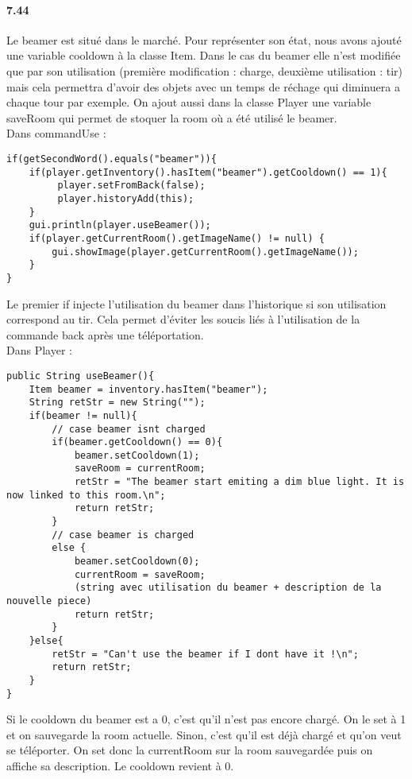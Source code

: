\documentclass[11pt,a4paper]{report}
\begin{document}
\paragraph{7.44}
Le beamer est situé dans le marché. Pour représenter son état, nous avons ajouté une variable cooldown à la classe Item. Dans le cas du beamer elle n'est modifiée que par son utilisation (première modification : charge, deuxième utilisation : tir) mais cela permettra d'avoir des objets avec un temps de réchage qui diminuera a chaque tour par exemple. On ajout aussi dans la classe Player une variable saveRoom qui permet de stoquer la room où a été utilisé le beamer.\\
Dans commandUse :
\begin{lstlisting}
if(getSecondWord().equals("beamer")){
    if(player.getInventory().hasItem("beamer").getCooldown() == 1){
         player.setFromBack(false);
         player.historyAdd(this);
    }
    gui.println(player.useBeamer());
    if(player.getCurrentRoom().getImageName() != null) {
        gui.showImage(player.getCurrentRoom().getImageName());
    }
}
\end{lstlisting}
Le premier if injecte l'utilisation du beamer dans l'historique si son utilisation correspond au tir. Cela permet d'éviter les soucis liés à l'utilisation de la commande back après une téléportation. \\
Dans Player :
\begin{lstlisting}
public String useBeamer(){
    Item beamer = inventory.hasItem("beamer");
    String retStr = new String("");
    if(beamer != null){
        // case beamer isnt charged
        if(beamer.getCooldown() == 0){
            beamer.setCooldown(1);
            saveRoom = currentRoom;
            retStr = "The beamer start emiting a dim blue light. It is now linked to this room.\n";
            return retStr;
        }
        // case beamer is charged
        else {
            beamer.setCooldown(0);
            currentRoom = saveRoom;
            (string avec utilisation du beamer + description de la nouvelle piece)
            return retStr;
        }
    }else{
        retStr = "Can't use the beamer if I dont have it !\n";
        return retStr;
    }
}
\end{lstlisting}
Si le cooldown du beamer est a 0, c'est qu'il n'est pas encore chargé. On le set à 1 et on sauvegarde la room actuelle. Sinon, c'est qu'il est déjà chargé et qu'on veut se téléporter. On set donc la currentRoom sur la room sauvegardée puis on affiche sa description. Le cooldown revient à 0.
\end{document}
